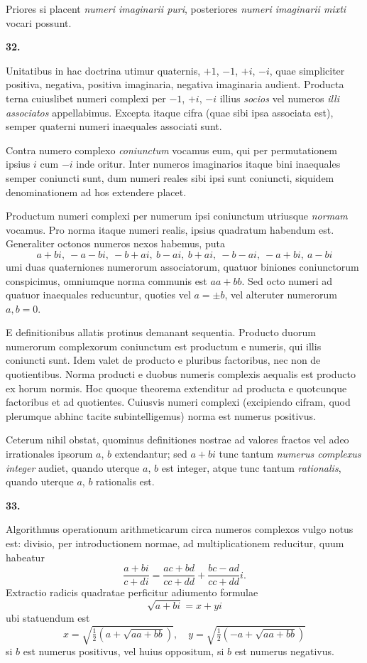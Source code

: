 \documentclass[12pt,a4paper]{article}
\newcommand{\art}[1]{\begin{center}\textbf{#1.}\end{center}}
\begin{document}
Priores si placent \textit{numeri imaginarii puri}, posteriores \textit{numeri imaginarii mixti} vocari possunt.

\art{32}

Unitatibus in hac doctrina utimur quaternis, $+1$, $-1$, $+i$, $-i$, quae simpliciter positiva, negativa, positiva imaginaria, negativa imaginaria audient. Producta terna cuiuslibet numeri complexi per $-1$, $+i$, $-i$ illius \textit{socios} vel numeros \textit{illi associatos} appellabimus. Excepta itaque cifra (quae sibi ipsa associata est), semper quaterni numeri inaequales associati sunt.

Contra numero complexo \textit{coniunctum} vocamus eum, qui per permutationem ipsius $i$ cum $-i$ inde oritur. Inter numeros imaginarios itaque bini inaequales semper coniuncti sunt, dum numeri reales sibi ipsi sunt coniuncti, siquidem denominationem ad hos extendere placet.

Productum numeri complexi per numerum ipsi coniunctum utriusque \textit{normam} vocamus. Pro norma itaque numeri realis, ipsius quadratum habendum est. Generaliter octonos numeros nexos habemus, puta
\[a+bi,\ -a-bi,\ -b+ai,\ b-ai,\ b+ai,\ -b-ai,\ -a+bi,\ a-bi\]
umi duas quaterniones numerorum associatorum, quatuor biniones coniunctorum conspicimus, omniumque norma communis est $aa+bb$. Sed octo numeri ad quatuor inaequales reducuntur, quoties vel $a=\pm b$, vel alteruter numerorum $a,b=0$.

E definitionibus allatis protinus demanant sequentia. Producto duorum numerorum complexorum coniunctum est productum e numeris, qui illis coniuncti sunt. Idem valet de producto e pluribus factoribus, nec non de quotientibus. Norma producti e duobus numeris complexis aequalis est producto ex horum normis. Hoc quoque theorema extenditur ad producta e quotcunque factoribus et ad quotientes. Cuiusvis numeri complexi (excipiendo cifram, quod plerumque abhinc tacite subintelligemus) norma est numerus positivus.

Ceterum nihil obstat, quominus definitiones nostrae ad valores fractos vel adeo irrationales ipsorum $a$, $b$ extendantur; sed $a+bi$ tunc tantum \textit{numerus complexus integer} audiet, quando uterque $a$, $b$ est integer, atque tunc tantum \textit{rationalis}, quando uterque $a$, $b$ rationalis est.

\art{33}

Algorithmus operationum arithmeticarum circa numeros complexos vulgo notus est: divisio, per introductionem normae, ad multiplicationem reducitur, quum habeatur
\[\frac{a+bi}{c+di} = \frac{ac+bd}{cc+dd} + \frac{bc-ad}{cc+dd}i.\]
Extractio radicis quadratae perficitur adiumento formulae
\[\sqrt{a+bi} = x+yi\]
ubi statuendum est
\[x = \sqrt{\tfrac{1}{2}(a+\sqrt{aa+bb})},\quad y = \sqrt{\tfrac{1}{2}(-a+\sqrt{aa+bb})}\]
si $b$ est numerus positivus, vel huius oppositum, si $b$ est numerus negativus.
\end{document}

